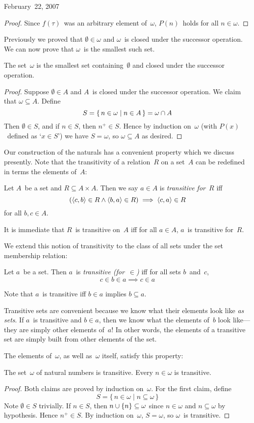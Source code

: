 \begin{lecture}{February~22, 2007}
\begin{proof}
Since \(f(\tau)\)~was an arbitrary element of~\(\omega\), \(P(n)\)~holds for all \(n\in\omega\).
\end{proof}
\noindent Previously we proved that \(\emptyset\in\omega\) and \(\omega\)~is closed under the successor operation. We can now prove that \(\omega\)~is the smallest such set.
\begin{cor}
The set~\(\omega\) is the smallest set containing~\(\emptyset\) and closed under the successor operation.
\end{cor}
\begin{proof}
Suppose \(\emptyset\in A\) and \(A\)~is closed under the successor operation. We claim that \(\omega\subseteq A\). Define
\[S=\{\,n\in\omega\mid n\in A\,\}=\omega\cap A\]
Then \(\emptyset\in S\), and if \(n\in S\), then \(n^+\in S\). Hence by induction on~\(\omega\) (with \(P(x)\)~defined as `\(x\in S\)') we have \(S=\omega\), so \(\omega\subseteq A\) as desired.
\end{proof}

Our construction of the naturals has a convenient property which we discuss presently. Note that the transitivity of a relation~\(R\) on a set~\(A\) can be redefined in terms the elements of~\(A\):
\begin{defn}
Let \(A\)~be a set and \(R\subseteq A\times A\). Then we say \(a\in A\) is \emph{transitive for~\(R\)} iff
\[(\langle{c},{b}\rangle\in R\land\langle{b},{a}\rangle\in R)\implies \langle{c},{a}\rangle\in R\]
for all \(b,c\in A\).
\end{defn}
\noindent It is immediate that \(R\)~is transitive on~\(A\) iff for all \(a\in A\), \(a\)~is transitive for~\(R\).

We extend this notion of transitivity to the class of all sets under the set membership relation:
\begin{defn}
Let \(a\)~be a set. Then \(a\)~is \emph{transitive (for~\(\in\))} iff for all sets \(b\)~and~\(c\),
\[c\in b\in a\implies c\in a\]
\end{defn}
\noindent Note that \(a\)~is transitive iff \(b\in a\) implies \(b\subseteq a\).

Transitive sets are convenient because we know what their elements look like \emph{as sets}. If \(a\)~is transitive and \(b\in a\), then we know what the elements of~\(b\) look like---they are simply other elements of~\(a\)! In other words, the elements of a transitive set are simply built from other elements of the set.

The elements of~\(\omega\), as well as~\(\omega\) itself, satisfy this property:
\begin{thm}
The set~\(\omega\) of natural numbers is transitive. Every \(n\in\omega\) is transitive.
\end{thm}
\begin{proof}
Both claims are proved by induction on~\(\omega\). For the first claim, define
\[S=\{\,n\in\omega\mid n\subseteq\omega\,\}\]
Note \(\emptyset\in S\) trivially. If \(n\in S\), then \(n\cup\{n\}\subseteq\omega\) since \(n\in\omega\) and \(n\subseteq\omega\) by hypothesis. Hence \(n^+\in S\). By induction on~\(\omega\), \(S=\omega\), so \(\omega\)~is transitive.


\end{proof}
\end{lecture}
